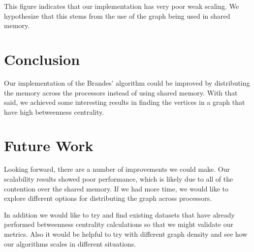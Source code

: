 \documentclass[11pt,a4paper,titlepage]{article}
\begin{document}
This figure indicates that our implementation has very poor weak scaling. We
hypothesize that this stems from the use of the graph being used in shared
memory.



\section{Conclusion} %
\label{sec:conclusion}

Our implementation of the Brandes' algorithm could be improved by distributing
the memory across the processors instead of using shared memory. With that said,
we achieved some interesting results in finding the vertices in a graph that
have high betweenness centrality.



\section{Future Work}
\label{sec:future-work}

Looking forward, there are a number of improvements we could make. Our
scalability results showed poor performance, which is likely due to all of the
contention over the shared memory. If we had more time, we would like to
explore different options for distributing the graph across processors.

In addition we would like to try and find existing datasets that have already
performed betweenness centrality calculations so that we might validate our
metrics. Also it would be helpful to try with different graph density and see
how our algorithms scales in different situations.




\newpage


\end{document}
